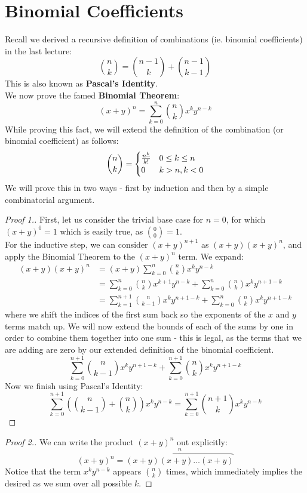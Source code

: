 \section{Binomial Coefficients}
Recall we derived a recursive definition of combinations (ie. binomial coefficients) in the last lecture: 
\[
	\binom{n}{k} = \binom{n-1}{k} + \binom{n-1}{k-1}
\]
This is also known as \textbf{Pascal's Identity}.\\
We now prove the famed \textbf{Binomial Theorem}: 
\[
	(x+y)^n = \sum_{k=0}^n \binom{n}{k} x^k y^{n-k}
\]
While proving this fact, we will extend the definition of the combination (or binomial coefficient) as follows:
\[
	\binom{n}{k} = \begin{cases} 
      \frac{{n}^{\underline{k}}}{k!} & 0 \leq k \leq n \\
      0 & k > n, k < 0
   \end{cases}
\]
We will prove this in two ways - first by induction and then by a simple combinatorial argument. 
\begin{proof}[Proof 1.]
	First, let us consider the trivial base case for $n=0$, for which $(x+y)^0 = 1$ which is easily true, as $\binom{0}{0} = 1$.  \\
	For the inductive step, we can consider $(x+y)^{n+1}$ as $(x+y)(x+y)^n$, and apply the Binomial Theorem to the $(x+y)^n$ term. We expand: 
\begin{align*}
(x+y)(x+y)^n &= (x+y) \sum_{k=0}^n \binom{n}{k} x^k y^{n-k} \\
&= \sum_{k=0}^n \binom{n}{k} x^{k+1} y^{n-k} + \sum_{k=0}^n \binom{n}{k} x^k y^{n+1-k} \\
&= \sum_{k=1}^{n+1} \binom{n}{k-1} x^{k} y^{n+1-k} + \sum_{k=0}^n \binom{n}{k} x^k y^{n+1-k} 
\end{align*}
where we shift the indices of the first sum back so the exponents of the $x$ and $y$ terms match up. We will now extend the bounds of each of the sums by one in order to combine them together into one sum - this is legal, as the terms that we are adding are zero by our extended definition of the binomial coefficient. 
\[
	\sum_{k=0}^{n+1} \binom{n}{k-1} x^{k} y^{n+1-k} + \sum_{k=0}^{n+1} \binom{n}{k} x^k y^{n+1-k} 
\]
Now we finish using Pascal's Identity:
\[
	\sum_{k=0}^{n+1} \left(\binom{n}{k-1} + \binom{n}{k}\right) x^{k} y^{n-k} = \sum_{k=0}^{n+1} \binom{n+1}{k} x^{k} y^{n-k} 
\]
\end{proof}
\begin{proof}[Proof 2.]
	We can write the product $(x+y)^n$ out explicitly:
\[
	(x+y)^n = \overbrace{(x+y)(x+y)\ldots (x+y)}^n
\]
Notice that the term $x^k y^{n-k}$ appears $\binom{n}{k}$ times, which immediately implies the desired as we sum over all possible $k$. 
\end{proof}
